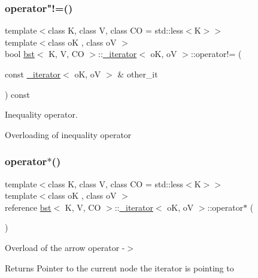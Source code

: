 \subsubsection{\texorpdfstring{operator"!=()}{operator!=()}\hspace{0.1cm}{\footnotesize\ttfamily [2/2]}}
{\footnotesize\ttfamily template$<$class K, class V, class CO = std\+::less$<$\+K$>$$>$ \\
template$<$class oK , class oV $>$ \\
bool \hyperlink{classbst}{bst}$<$ K, V, CO $>$\+::\hyperlink{classbst_1_1__iterator}{\+\_\+iterator}$<$ oK, oV $>$\+::operator!= (\begin{DoxyParamCaption}\item[{const \hyperlink{classbst_1_1__iterator}{\+\_\+iterator}$<$ oK, oV $>$ \&}]{other\+\_\+it }\end{DoxyParamCaption}) const\hspace{0.3cm}{\ttfamily [inline]}}



Inequality operator. 

Overloading of inequality operator \mbox{\label{classbst_1_1__iterator_a2c9b9c771a694c86fa380a461cde102d}} 
\subsubsection{\texorpdfstring{operator$\ast$()}{operator*()}\hspace{0.1cm}{\footnotesize\ttfamily [1/2]}}
{\footnotesize\ttfamily template$<$class K, class V, class CO = std\+::less$<$\+K$>$$>$ \\
template$<$class oK , class oV $>$ \\
reference \hyperlink{classbst}{bst}$<$ K, V, CO $>$\+::\hyperlink{classbst_1_1__iterator}{\+\_\+iterator}$<$ oK, oV $>$\+::operator$\ast$ (\begin{DoxyParamCaption}{ }\end{DoxyParamCaption})\hspace{0.3cm}{\ttfamily [inline]}}



Overload of the arrow operator -\/$>$ 

\begin{DoxyReturn}{Returns}
Pointer to the current node the iterator is pointing to 
\end{DoxyReturn}
\mbox{\label{classbst_1_1__iterator_a2c9b9c771a694c86fa380a461cde102d}} 
